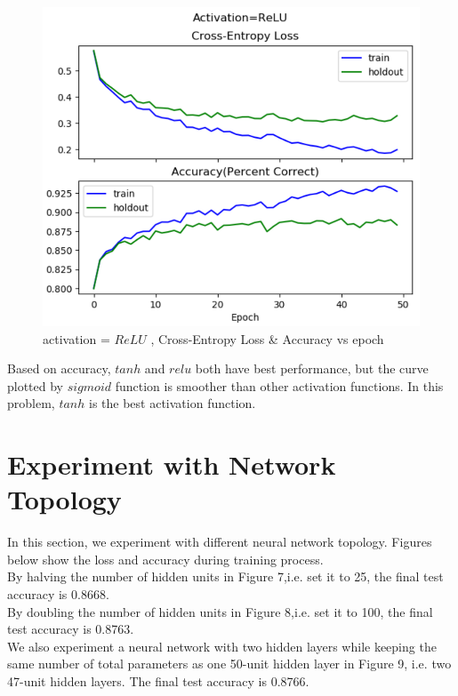 \documentclass{article} %
\begin{document}
\begin{figure}[h]	
	\centering
	\includegraphics[scale=0.5]{./plots/ReLUActivation.png}
	\caption{activation = $ReLU$ , Cross-Entropy Loss \& Accuracy vs epoch}
\end{figure}
Based on accuracy, $tanh$ and $relu$ both have best performance, but the curve plotted by $sigmoid$ function is smoother than other activation functions. In this problem, $tanh$ is the best activation function.\\

\section{Experiment with Network Topology}
In this section, we experiment with different neural network topology. Figures below show the loss and accuracy during training process. \\
By halving the number of hidden units in Figure 7,i.e. set it to 25, the final test accuracy is 0.8668.\\
By doubling the number of hidden units in Figure 8,i.e. set it to 100, the final test accuracy is 0.8763.\\
We also experiment a neural network with two hidden layers while keeping the same number of total parameters as one 50-unit hidden layer in Figure 9, i.e. two 47-unit hidden layers. The final test accuracy is 0.8766. \\
\end{document}
